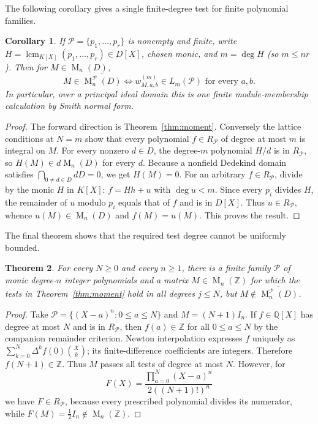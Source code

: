 \documentclass[11pt]{amsart}
\newtheorem{theorem}{Theorem}[section]
\newtheorem{corollary}[theorem]{Corollary}
\theoremstyle{definition}
\theoremstyle{remark}
\newcommand{\Mat}{\operatorname{M}}
\begin{document}
The following corollary gives a single finite-degree test for finite polynomial families.
\begin{corollary}\label{cor:finite-degree}
If $\mathcal P=\{p_1,\ldots,p_r\}$ is nonempty and finite, write
$H=\operatorname{lcm}_{K[X]}(p_1,\ldots,p_r)\in D[X]$, chosen monic,
and $m=\deg H$ (so $m\le nr$).
Then for $M\in\Mat_n(D)$,
\[
 M\in\overline{\Mat_n^{\mathcal P}(D)}
 \iff w^{(m)}_{M,a,b}\in L_m(\mathcal P)
 \text{ for every }a,b.
\]
In particular, over a principal ideal domain this is one finite
module-membership calculation by Smith normal form.
\end{corollary}
\begin{proof}
The forward direction is Theorem~\ref{thm:moment}.  Conversely the
lattice conditions at $N=m$ show that every polynomial $f\in
R_{\mathcal P}$ of degree at most $m$ is integral on $M$.
For every nonzero $d\in D$, the degree-$m$ polynomial $H/d$ is in
$R_{\mathcal P}$, so $H(M)\in d\Mat_n(D)$ for every $d$.  Because a
nonfield Dedekind domain satisfies $\bigcap_{0\ne d\in D}dD=0$,
we get $H(M)=0$.
For an arbitrary $f\in R_{\mathcal P}$, divide by the monic $H$ in
$K[X]$: $f=Hh+u$ with $\deg u<m$.  Since every $p_i$ divides $H$,
the remainder of $u$ modulo $p_i$ equals that of $f$ and is in $D[X]$.
Thus $u\in R_{\mathcal P}$, whence $u(M)\in\Mat_n(D)$ and
$f(M)=u(M)$.  This proves the result.
\end{proof}


The final theorem shows that the required test degree cannot be uniformly bounded.
\begin{theorem}\label{thm:nofixeddegree}
For every $N\ge0$ and every $n\ge1$, there is a finite family
$\mathcal P$ of monic degree-$n$ integer polynomials and a matrix
$M\in\Mat_n(\mathbb Z)$ for which the tests in
Theorem~\ref{thm:moment} hold in all degrees $j\le N$, but
$M\notin\overline{\Mat_n^{\mathcal P}(D)}$.
\end{theorem}
\begin{proof}
Take $\mathcal P=\{(X-a)^n:0\le a\le N\}$ and
$M=(N+1)I_n$.  If $f\in\mathbb Q[X]$ has degree at most $N$
and is in $R_{\mathcal P}$, then $f(a)\in\mathbb Z$ for all
$0\le a\le N$ by the companion remainder criterion.
Newton interpolation expresses $f$ uniquely as
$\sum_{k=0}^N\Delta^kf(0)\binom Xk$; its finite-difference
coefficients are integers.  Therefore $f(N+1)\in\mathbb Z$.
Thus $M$ passes all tests of degree at most $N$.
However, for
\[
 F(X)=\frac{\prod_{a=0}^{N}(X-a)^n}
 {2((N+1)!)^n}
\]
we have $F\in R_{\mathcal P}$, because every prescribed polynomial
divides its numerator, while $F(M)=\tfrac12 I_n\notin\Mat_n(\mathbb Z)$.
\end{proof}
\end{document}
